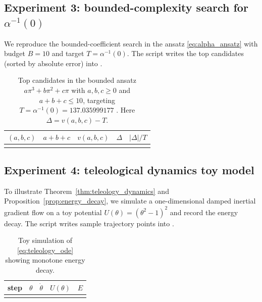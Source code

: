 \subsection{Experiment 3: bounded-complexity search for \texorpdfstring{$\alpha^{-1}(0)$}{alpha inverse}}
\label{sec:exp_alpha_inverse}

We reproduce the bounded-coefficient search in the ansatz \eqref{eq:alpha_ansatz} with budget $B=10$ and target $T=\alpha^{-1}(0)$.
The script writes the top candidates (sorted by absolute error) into .

\begin{table}[t]
\centering
\begin{tabular}{@{}rrrrr@{}}
\toprule
$(a,b,c)$ & $a+b+c$ & $v(a,b,c)$ & $\Delta$ & $|\Delta|/T$ \\
\midrule

\\
\bottomrule
\end{tabular}
\caption{Top candidates in the bounded ansatz $a\pi^3+b\pi^2+c\pi$ with $a,b,c\ge 0$ and $a+b+c\le 10$, targeting $T=\alpha^{-1}(0)=137.035999177$ \cite{CODATA2022RMP}. Here $\Delta=v(a,b,c)-T$.}
\label{tab:alpha_inverse_search}
\end{table}

\subsection{Experiment 4: teleological dynamics toy model}
\label{sec:exp_dynamics}

To illustrate Theorem~\ref{thm:teleology_dynamics} and Proposition~\ref{prop:energy_decay}, we simulate a one-dimensional damped inertial gradient flow on a toy potential $U(\theta)=(\theta^2-1)^2$ and record the energy decay.
The script writes sample trajectory points into .

\begin{table}[t]
\centering
\begin{tabular}{@{}rrrrr@{}}
\toprule
step & $\theta$ & $\dot\theta$ & $U(\theta)$ & $E$ \\
\midrule

\\
\bottomrule
\end{tabular}
\caption{Toy simulation of \eqref{eq:teleology_ode} showing monotone energy decay.}
\label{tab:teleology_energy}
\end{table}


